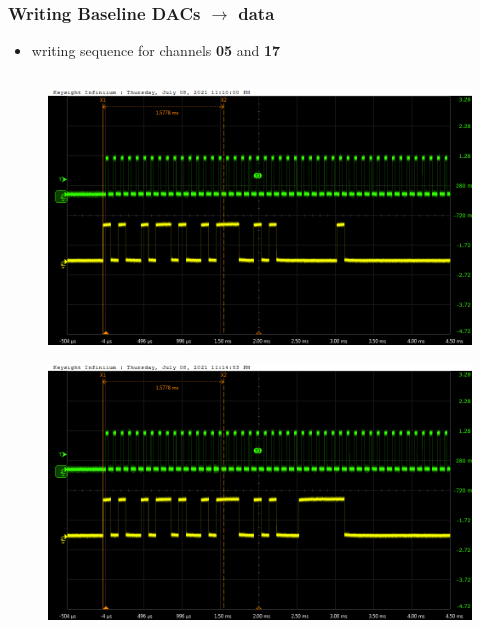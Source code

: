 \documentclass[aspectratio=169]{beamer}
\begin{document}
	\begin{frame}
	\frametitle{Writing Baseline DACs $\rightarrow$ data}
	\begin{itemize}
		\item writing sequence for channels \textbf{05} and \textbf{17}
	\end{itemize}
	\begin{columns}
		\begin{center}
			\begin{figure}
				\includegraphics[width=0.55 \textwidth]{IMG/probe/09-08-2021_ch05-write01-baselinedac1.png}
				\caption{}
			\end{figure}
			\begin{figure}
				\includegraphics[width=0.55 \textwidth]{IMG/probe/09-08-2021_ch05-write63-baselinedac1.png}
				\caption{}
			\end{figure}		
		\end{center}
		

\end{columns}
\end{frame}
\end{document}
